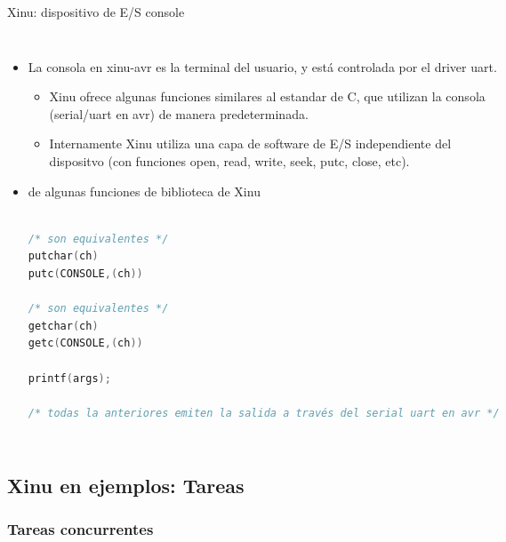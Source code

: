 \documentclass[8pt,aspectratio=169,compress]{beamer}
\begin{document}
\begin{frame}[fragile]{Xinu: dispositivo de E/S console}

    \begin{columns}[onlytextwidth,T]
      \column{\dimexpr\linewidth-60mm-5mm}

	\begin{itemize}
  \item[CONSOLE] La consola en xinu-avr es la terminal del usuario, y está controlada por el driver uart.

\bigskip
\begin{itemize}
\item Xinu ofrece algunas funciones similares al estandar de C, que utilizan la consola (serial/uart en avr) de manera predeterminada.
\item Internamente Xinu utiliza una capa de software de E/S independiente del dispositvo (con funciones open, read, write, seek, putc, close, etc).

\end{itemize}

\bigskip
\item[API] de algunas funciones de biblioteca de Xinu

\begin{lstlisting}[language=c,basicstyle=\footnotesize]

/* son equivalentes */
putchar(ch)     
putc(CONSOLE,(ch))

/* son equivalentes */
getchar(ch)     
getc(CONSOLE,(ch))

printf(args); 

/* todas la anteriores emiten la salida a través del serial uart en avr */
\end{lstlisting}

	\end{itemize}

      \column{50mm}

    \end{columns}
\end{frame}


\subsection{Xinu en ejemplos: Tareas}

\subsubsection{Tareas concurrentes}
\end{document}

